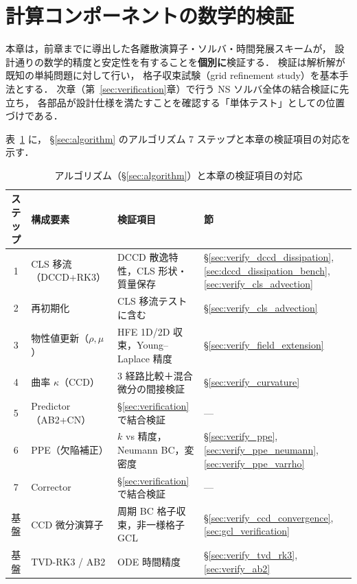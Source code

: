 \section{計算コンポーネントの数学的検証}
\label{sec:numerical_integrity}%
\label{sec:impl_collocate}%

本章は，前章までに導出した各離散演算子・ソルバ・時間発展スキームが，
設計通りの数学的精度と安定性を有することを\textbf{個別に}検証する．
検証は解析解が既知の単純問題に対して行い，
格子収束試験（grid refinement study）を基本手法とする．
次章（第~\ref{sec:verification}章）で行う NS ソルバ全体の結合検証に先立ち，
各部品が設計仕様を満たすことを確認する「単体テスト」としての位置づけである．

表~\ref{tab:component_algorithm_map} に，
§\ref{sec:algorithm} のアルゴリズム 7 ステップと本章の検証項目の対応を示す．

\begin{table}[htbp]
\centering
\caption{アルゴリズム（§\ref{sec:algorithm}）と本章の検証項目の対応}
\label{tab:component_algorithm_map}
\renewcommand{\arraystretch}{1.3}
\small
\begin{tabular}{clp{4.2cm}p{4.0cm}}
\toprule
ステップ & 構成要素 & 検証項目 & 節 \\
\midrule
1 & CLS 移流（DCCD+RK3） & DCCD 散逸特性，CLS 形状・質量保存 & §\ref{sec:verify_dccd_dissipation}, \ref{sec:dccd_dissipation_bench}, \ref{sec:verify_cls_advection} \\
2 & 再初期化 & CLS 移流テストに含む & §\ref{sec:verify_cls_advection} \\
3 & 物性値更新（$\rho, \mu$） & HFE 1D/2D 収束，Young--Laplace 精度 & §\ref{sec:verify_field_extension} \\
4 & 曲率 $\kappa$（CCD） & 3 経路比較＋混合微分の間接検証 & §\ref{sec:verify_curvature} \\
5 & Predictor（AB2+CN） & §\ref{sec:verification} で結合検証 & — \\
6 & PPE（欠陥補正） & $k$ vs 精度，Neumann BC，変密度 & §\ref{sec:verify_ppe}, \ref{sec:verify_ppe_neumann}, \ref{sec:verify_ppe_varrho} \\
7 & Corrector & §\ref{sec:verification} で結合検証 & — \\
\midrule
基盤 & CCD 微分演算子 & 周期 BC 格子収束，非一様格子 GCL & §\ref{sec:verify_ccd_convergence}, \ref{sec:gcl_verification} \\
基盤 & TVD-RK3 / AB2 & ODE 時間精度 & §\ref{sec:verify_tvd_rk3}, \ref{sec:verify_ab2} \\
\bottomrule
\end{tabular}
\end{table}

